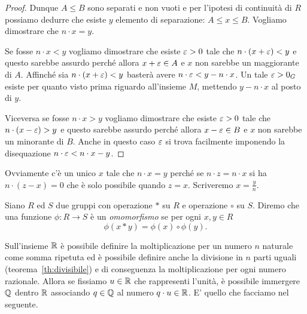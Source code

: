 \begin{proof}
Dunque $A\le B$ sono separati e non vuoti e per l'ipotesi di continuità di $R$ 
possiamo dedurre che esiste $y$ elemento di separazione: $A\le x \le B$.
Vogliamo dimostrare che $n\cdot x=y$.

Se fosse $n\cdot x<y$ vogliamo dimostrare che esiste $\varepsilon>0$ 
tale che $n\cdot(x+\varepsilon)<y$ e questo sarebbe assurdo perché
allora $x+\varepsilon\in A$ e $x$ non sarebbe un maggiorante di $A$.
Affinché sia $n\cdot(x+\varepsilon)<y$ basterà avere $n\cdot \varepsilon < y-n\cdot x$.
Un tale $\varepsilon>0_G$ esiste per quanto visto prima riguardo all'insieme 
$M$, mettendo $y-n\cdot x$ al posto di $y$.

Viceversa se fosse $n\cdot x>y$ vogliamo dimostrare che esiste $\varepsilon>0$
tale che $n\cdot(x-\varepsilon)>y$ e questo sarebbe assurdo perché
allora $x-\varepsilon\in B$ e $x$ non sarebbe un minorante di $B$.
Anche in questo caso $\varepsilon$ si trova facilmente imponendo 
la disequazione $n\cdot \varepsilon < n\cdot x-y$.
\end{proof}

Ovviamente c'è un unico $x$ tale che $n\cdot x=y$ perché 
se $n\cdot z = n\cdot x$ si ha $n\cdot (z-x) = 0$ che è 
solo possibile quando $z=x$. Scriveremo $x=\frac{y}{n}$.

\begin{definition}[omomorfismo]%
\label{def:omomorfismo}%
Siano $R$ ed $S$ due gruppi con operazione $*$ su $R$ e operazione $\circ$ su $S$.
Diremo che una funzione $\phi\colon R\to S$ è un \emph{omomorfismo}%
%
 se per ogni $x,y \in R$
\[
  \phi(x*y) = \phi(x)\circ \phi(y).
\]
\end{definition}

Sull'insieme ${\mathbb R}$ è possibile definire la moltiplicazione per 
un numero $n$ naturale come somma ripetuta ed è possibile definire anche la divisione in $n$
parti uguali (teorema~\ref{th:divisibile}) e di conseguenza la moltiplicazione per ogni numero razionale.
Allora se fissiamo $u\in {\mathbb R}$ che rappresenti l'unità, è possibile immergere ${\mathbb Q}$ dentro ${\mathbb R}$
associando $q\in {\mathbb Q}$ al numero $q\cdot u\in {\mathbb R}$.
E' quello che facciamo nel seguente.

